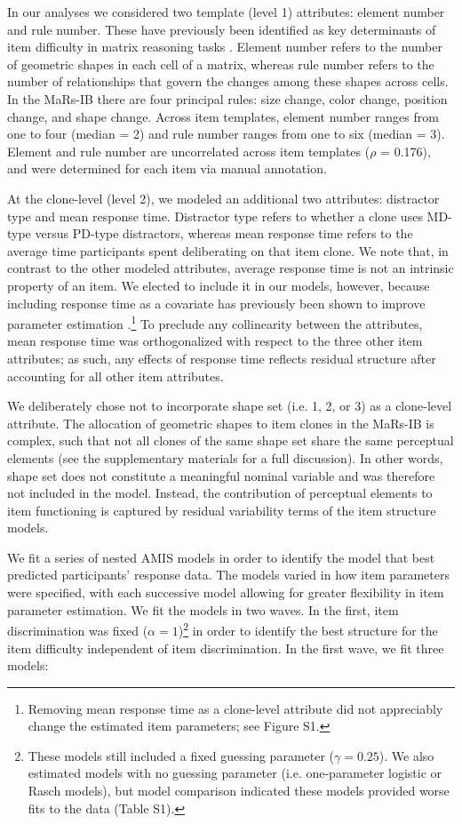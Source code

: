 \documentclass[a4paper,man,natbib]{apa6}
\begin{document}
In our analyses we considered two template (level 1) attributes: element number and rule number. These have previously been identified as key determinants of item difficulty in matrix reasoning tasks \citep{embretson1998cognitive, primi2001complexity}. Element number refers to the number of geometric shapes in each cell of a matrix, whereas rule number refers to the number of relationships that govern the changes among these shapes across cells. In the MaRs-IB there are four principal rules: size change, color change, position change, and shape change. Across item templates, element number ranges from one to four (median = 2) and rule number ranges from one to six (median = 3). Element and rule number are uncorrelated across item templates ($\rho$ = 0.176), and were determined for each item via manual annotation.  

At the clone-level (level 2), we modeled an additional two attributes: distractor type and mean response time. Distractor type refers to whether a clone uses MD-type versus PD-type distractors, whereas mean response time refers to the average time participants spent deliberating on that item clone. We note that, in contrast to the other modeled attributes, average response time is not an intrinsic property of an item. We elected to include it in our models, however, because including response time as a covariate has previously been shown to improve parameter estimation \citep{bertling2018using}.\footnote{Removing mean response time as a clone-level attribute did not appreciably change the estimated item parameters; see Figure S1.} To preclude any collinearity between the attributes, mean response time was orthogonalized with respect to the three other item attributes; as such, any effects of response time reflects residual structure after accounting for all other item attributes.

We deliberately chose not to incorporate shape set (i.e. 1, 2, or 3) as a clone-level attribute. The allocation of geometric shapes to item clones in the MaRs-IB is complex, such that not all clones of the same shape set share the same perceptual elements (see the supplementary materials for a full discussion). In other words, shape set does not constitute a meaningful nominal variable and was therefore not included in the model. Instead, the contribution of perceptual elements to item functioning is captured by residual variability terms of the item structure models.

We fit a series of nested AMIS models in order to identify the model that best predicted participants' response data. The models varied in how item parameters were specified, with each successive model allowing for greater flexibility in item parameter estimation. We fit the models in two waves. In the first, item discrimination was fixed ($\alpha = 1$)\footnote{These models still included a fixed guessing parameter ($\gamma = 0.25$). We also estimated models with no guessing parameter (i.e. one-parameter logistic or Rasch models), but model comparison indicated these models provided worse fits to the data (Table S1).} in order to identify the best structure for the item difficulty independent of item discrimination. In the first wave, we fit three models:
\end{document}
